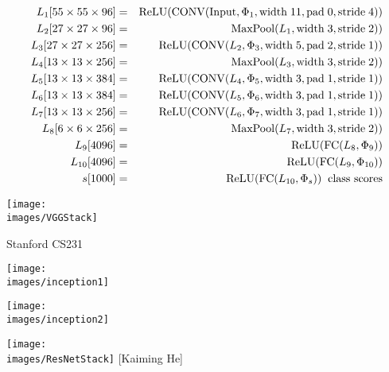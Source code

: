 {{\begin{eqnarray*}
L_1[55 \times 55 \times 96] & = & \mathrm{ReLU}(\mathrm{CONV}(\mathrm{Input},\Phi_1,\mathrm{width}\;11,\mathrm{pad}\;0,\mathrm{stride}\;4)) \\
L_2[27 \times 27 \times 96] & = & \mathrm{MaxPool}(L_1,\mathrm{width}\;3,\mathrm{stride}\;2))  \\
L_3[27 \times 27 \times 256] & = & \mathrm{ReLU}(\mathrm{CONV}(L_2,\Phi_3,\mathrm{width}\;5,\mathrm{pad}\;2,\mathrm{stride}\;1))  \\
L_4[13 \times 13 \times 256] & = & \mathrm{MaxPool}(L_3,\mathrm{width}\;3,\mathrm{stride}\;2))  \\
L_5[13 \times 13 \times 384] & = & \mathrm{ReLU}(\mathrm{CONV}(L_4,\Phi_5,\mathrm{width}\;3,\mathrm{pad}\;1,\mathrm{stride}\;1))  \\
L_6[13 \times 13 \times 384] & = & \mathrm{ReLU}(\mathrm{CONV}(L_5,\Phi_6,\mathrm{width}\;3,\mathrm{pad}\;1,\mathrm{stride}\;1))  \\
L_7[13 \times 13 \times 256] & = & \mathrm{ReLU}(\mathrm{CONV}(L_6,\Phi_7,\mathrm{width}\;3,\mathrm{pad}\;1,\mathrm{stride}\;1))  \\
L_8[6 \times 6 \times 256] & = & \mathrm{MaxPool}(L_7,\mathrm{width}\;3,\mathrm{stride}\;2)) \\
L_9[4096] & = & \mathrm{ReLU}(\mathrm{FC}(L_8,\Phi_9)) \\
L_{10}[4096] & = & \mathrm{ReLU}(\mathrm{FC}(L_9,\Phi_{10})) \\
s[1000] & = & \mathrm{ReLU}(\mathrm{FC}(L_{10},\Phi_s)) \;\;\mbox{class scores}
\end{eqnarray*}
}

\centerline{\texttt{[image: \\images/VGGStack]}}
\centerline{\large Stanford CS231}


\centerline{\texttt{[image: \\images/inception1]}}
\vfill
\centerline{\texttt{[image: \\images/inception2]}}

\centerline{\texttt{[image: \\images/ResNetStack]} {\large [Kaiming He]}}


}

